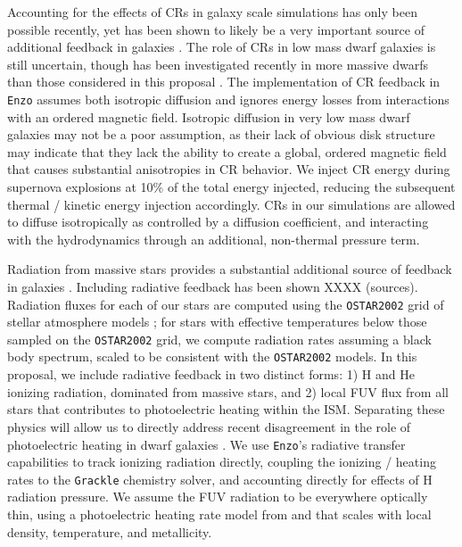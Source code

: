 \documentclass[11pt]{article}
\newcommand{\eg}{e.g.,}
\begin{document}
Accounting for the effects of CRs in galaxy scale simulations has only been possible recently, yet has been shown to likely be a very important source of additional feedback in galaxies \citep[\eg][]{SalemBryan2014, SalemBryanHummels, SalemBryanCorlies, GirichidisCR, Pakmor2016, Simpson2016}. The role of CRs in low mass dwarf galaxies is still uncertain, though has been investigated recently in more massive dwarfs than those considered in this proposal \citep{Chen2016}. The implementation of CR feedback in \texttt{Enzo} \citep{SalemBryan2014} assumes both isotropic diffusion and ignores energy losses from interactions with an ordered magnetic field. Isotropic diffusion in very low mass dwarf galaxies may not be a poor assumption, as their lack of obvious disk structure may indicate that they lack the ability to create a global, ordered magnetic field that causes substantial anisotropies in CR behavior. We inject CR energy during supernova explosions at 10\% of the total energy injected, reducing the subsequent thermal / kinetic energy injection accordingly. CRs in our simulations are allowed to diffuse isotropically as controlled by a diffusion coefficient, and interacting with the hydrodynamics through an additional, non-thermal pressure term.

Radiation from massive stars provides a substantial additional source of feedback in galaxies \citep[\eg][]{Agertz2013}. Including radiative feedback has been shown XXXX (sources). Radiation fluxes for each of our stars are computed using the \texttt{OSTAR2002} grid of stellar atmosphere models \citep{Lanz2003}; for stars with effective temperatures below those sampled on the \texttt{OSTAR2002} grid, we compute radiation rates assuming a black body spectrum, scaled to be consistent with the \texttt{OSTAR2002} models. In this proposal, we include radiative feedback in two distinct forms: 1) H and He ionizing radiation, dominated from massive stars, and 2) local FUV flux from all stars that contributes to photoelectric heating within the ISM. Separating these physics will allow us to directly address recent disagreement in the role of photoelectric heating in dwarf galaxies \citep{Hu2016, Forbes2016}. We use \texttt{Enzo}'s radiative transfer capabilities \citep{Wise2012a,WiseAbel2012,Wise2014} to track ionizing radiation directly, coupling the ionizing / heating rates to the \texttt{Grackle} chemistry solver, and accounting directly for effects of H radiation pressure. We assume the FUV radiation to be everywhere optically thin, using a photoelectric heating rate model from \cite{BakesTielens1994} and \cite{Wolfire2003} that scales with local density, temperature, and metallicity.
\end{document}
